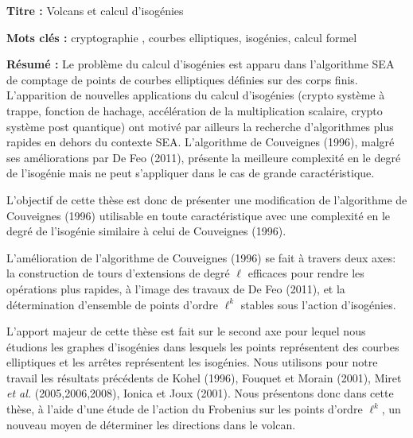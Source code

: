 \documentclass[a4paper, titlepage, 12pt]{book}
\newcommand{\titre}{Volcans et calcul d'isogénies}
\begin{document}
\begin{breakbox}

\noindent\textbf{Titre : }\titre

\vspace{2ex}

\noindent\textbf{Mots clés : }cryptographie , courbes elliptiques, isogénies, 
calcul formel

\begin{multicols}{2}
\noindent\textbf{Résumé : }
Le problème du calcul d'isogénies est apparu dans l'algorithme SEA de comptage
de points de courbes elliptiques définies sur des corps finis. L'apparition de 
nouvelles applications du calcul d'isogénies (crypto système à trappe, fonction 
de hachage, accélération de la multiplication scalaire, crypto système post 
quantique) ont motivé par ailleurs la recherche d'algorithmes plus rapides en 
dehors du contexte SEA. L'algorithme de Couveignes (1996), malgré ses 
améliorations par De Feo (2011), présente la meilleure complexité en le 
degré de l'isogénie mais ne peut s'appliquer dans le cas de grande 
caractéristique.


L'objectif de cette thèse est donc de présenter une modification de 
l'algorithme de Couveignes (1996) utilisable en toute caractéristique avec une 
complexité en le degré de l'isogénie similaire à celui de Couveignes (1996).


L'amélioration de l'algorithme de Couveignes (1996) se fait à 
travers deux axes: la construction de tours d'extensions
de degré $\ell$ efficaces pour rendre les opérations plus rapides, à l'image 
des travaux de De Feo (2011), et la détermination d'ensemble de points d'ordre 
$\ell^k$ stables sous l'action d'isogénies.

L'apport majeur de cette thèse est fait sur le second axe pour lequel nous 
étudions les graphes d'isogénies dans lesquels les points représentent des 
courbes elliptiques et les arrêtes représentent les isogénies. Nous utilisons
pour notre travail les résultats précédents de Kohel (1996), Fouquet et Morain
(2001), Miret \emph{et al.} (2005,2006,2008), Ionica et Joux (2001). Nous 
présentons donc dans cette thèse, à l'aide d'une étude de l'action du Frobenius
sur les points d'ordre $\ell^k$, un nouveau moyen de déterminer les directions 
dans le volcan.



\end{multicols}
\end{breakbox}
\end{document}
